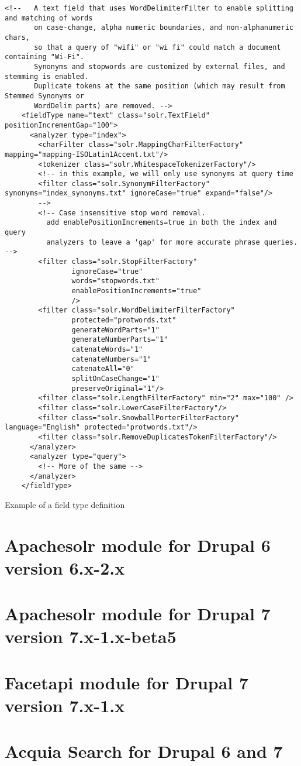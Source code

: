 \begin{listing}[H]
\begin{verbatim}
<!--   A text field that uses WordDelimiterFilter to enable splitting and matching of words
       on case-change, alpha numeric boundaries, and non-alphanumeric chars,
       so that a query of "wifi" or "wi fi" could match a document containing "Wi-Fi".
       Synonyms and stopwords are customized by external files, and stemming is enabled.
       Duplicate tokens at the same position (which may result from Stemmed Synonyms or
       WordDelim parts) are removed. -->
    <fieldType name="text" class="solr.TextField" positionIncrementGap="100">
      <analyzer type="index">
        <charFilter class="solr.MappingCharFilterFactory" mapping="mapping-ISOLatin1Accent.txt"/>
        <tokenizer class="solr.WhitespaceTokenizerFactory"/>
        <!-- in this example, we will only use synonyms at query time
        <filter class="solr.SynonymFilterFactory" synonyms="index_synonyms.txt" ignoreCase="true" expand="false"/>
        -->
        <!-- Case insensitive stop word removal.
          add enablePositionIncrements=true in both the index and query
          analyzers to leave a 'gap' for more accurate phrase queries. -->
        <filter class="solr.StopFilterFactory"
                ignoreCase="true"
                words="stopwords.txt"
                enablePositionIncrements="true"
                />
        <filter class="solr.WordDelimiterFilterFactory"
                protected="protwords.txt"
                generateWordParts="1"
                generateNumberParts="1"
                catenateWords="1"
                catenateNumbers="1"
                catenateAll="0"
                splitOnCaseChange="1"
                preserveOriginal="1"/>
        <filter class="solr.LengthFilterFactory" min="2" max="100" />
        <filter class="solr.LowerCaseFilterFactory"/>
        <filter class="solr.SnowballPorterFilterFactory" language="English" protected="protwords.txt"/>
        <filter class="solr.RemoveDuplicatesTokenFilterFactory"/>
      </analyzer>
      <analyzer type="query">
        <!-- More of the same -->
      </analyzer>
    </fieldType>
\end{verbatim}
\caption{Example of a field type definition}
\label{lst:fieldtypedefinition}
\end{listing}


\section{Apachesolr module for Drupal 6 version 6.x-2.x}
\section{Apachesolr module for Drupal 7 version 7.x-1.x-beta5}
\section{Facetapi module for Drupal 7 version 7.x-1.x}
\section{Acquia Search for Drupal 6 and 7}
